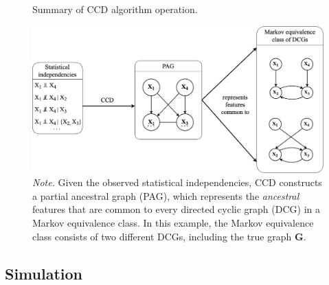 \documentclass[11pt]{article}
\begin{document}

\begin{figure}[H]
    \centering
        \caption{Summary of CCD algorithm operation.}
        \includegraphics[width=1\textwidth]{figures/CCDsummaryedited.png}
        \vspace{3mm}
        \caption*{\small{\textit{Note.} Given the observed statistical independencies, CCD constructs a partial ancestral graph (PAG), which represents the \textit{ancestral} features that are common to every directed cyclic graph (DCG) in a Markov equivalence class. In this example, the Markov equivalence class consists of two different DCGs, including the true graph $\boldsymbol{G}$.}}
    \label{fig:5}
\end{figure}



\clearpage
\restoregeometry

\pagebreak
{}

\subsection{Simulation}
\end{document}
